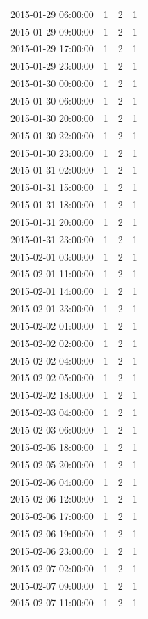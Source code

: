 \begin{tabular}{lrrr}
2015-01-29 06:00:00 & 1 & 2 & 1 \\
2015-01-29 09:00:00 & 1 & 2 & 1 \\
2015-01-29 17:00:00 & 1 & 2 & 1 \\
2015-01-29 23:00:00 & 1 & 2 & 1 \\
2015-01-30 00:00:00 & 1 & 2 & 1 \\
2015-01-30 06:00:00 & 1 & 2 & 1 \\
2015-01-30 20:00:00 & 1 & 2 & 1 \\
2015-01-30 22:00:00 & 1 & 2 & 1 \\
2015-01-30 23:00:00 & 1 & 2 & 1 \\
2015-01-31 02:00:00 & 1 & 2 & 1 \\
2015-01-31 15:00:00 & 1 & 2 & 1 \\
2015-01-31 18:00:00 & 1 & 2 & 1 \\
2015-01-31 20:00:00 & 1 & 2 & 1 \\
2015-01-31 23:00:00 & 1 & 2 & 1 \\
2015-02-01 03:00:00 & 1 & 2 & 1 \\
2015-02-01 11:00:00 & 1 & 2 & 1 \\
2015-02-01 14:00:00 & 1 & 2 & 1 \\
2015-02-01 23:00:00 & 1 & 2 & 1 \\
2015-02-02 01:00:00 & 1 & 2 & 1 \\
2015-02-02 02:00:00 & 1 & 2 & 1 \\
2015-02-02 04:00:00 & 1 & 2 & 1 \\
2015-02-02 05:00:00 & 1 & 2 & 1 \\
2015-02-02 18:00:00 & 1 & 2 & 1 \\
2015-02-03 04:00:00 & 1 & 2 & 1 \\
2015-02-03 06:00:00 & 1 & 2 & 1 \\
2015-02-05 18:00:00 & 1 & 2 & 1 \\
2015-02-05 20:00:00 & 1 & 2 & 1 \\
2015-02-06 04:00:00 & 1 & 2 & 1 \\
2015-02-06 12:00:00 & 1 & 2 & 1 \\
2015-02-06 17:00:00 & 1 & 2 & 1 \\
2015-02-06 19:00:00 & 1 & 2 & 1 \\
2015-02-06 23:00:00 & 1 & 2 & 1 \\
2015-02-07 02:00:00 & 1 & 2 & 1 \\
2015-02-07 09:00:00 & 1 & 2 & 1 \\
2015-02-07 11:00:00 & 1 & 2 & 1 \\

\end{tabular}
